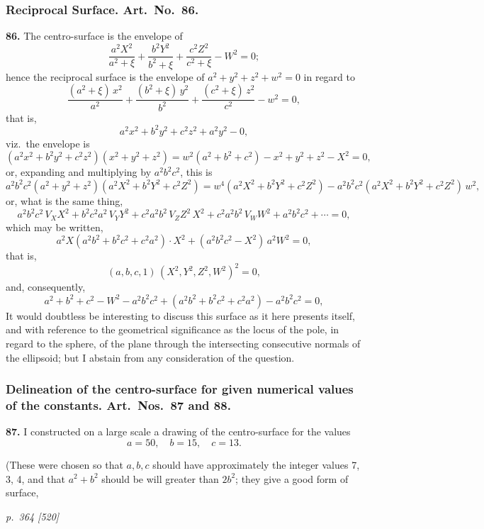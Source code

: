 \documentclass[11pt,a4paper]{article}
\theoremstyle{plain}
\theoremstyle{definition}
\begin{document}
\subsubsection*{Reciprocal Surface. Art.\ No.\ 86.}

\textbf{86.} The centro-surface is the envelope of
\[
\frac{a^2 X^2}{a^2 + \xi} + \frac{b^2 Y^2}{b^2 + \xi} + \frac{c^2 Z^2}{c^2 + \xi} - W^2 = 0;
\]
hence the reciprocal surface is the envelope of $a^2 + y^2 + z^2 + w^2 = 0$ in regard to
\[
\frac{(a^2 + \xi)\,x^2}{a^2}+\frac{(b^2 + \xi)\,y^2}{b^2}+\frac{(c^2 + \xi)\,z^2}{c^2} - w^2 = 0,
\]
that is,
\[
a^2 x^2 + b^2 y^2 + c^2 z^2 + a^2 y^2 - 0,
\]
viz.\ the envelope is
\[
(a^2 x^2 + b^2 y^2 + c^2 z^2)(x^2 + y^2 + z^2) = w^2 (a^2 + b^2 + c^2) - x^2 + y^2 + z^2 - X^2 = 0,
\]
or, expanding and multiplying by $a^2 b^2 c^2$, this is
\[
a^2 b^2 c^2 (a^2 + y^2 + z^2)(a^2 X^2 + b^2 Y^2 + c^2 Z^2) = w^4 (a^2 X^2 + b^2 Y^2 + c^2 Z^2) - a^2 b^2 c^2 (a^2 X^2 + b^2 Y^2 + c^2 Z^2)\,w^2,
\]
or, what is the same thing,
\[
a^2 b^2 c^2 \,V_X X^2 + b^2 c^2 a^2 \,V_Y Y^2 + c^2 a^2 b^2 \,V_Z Z^2 \,X^2 + c^2 a^2 b^2 \,V_W W^2 + a^2 b^2 c^2 + \cdots = 0,
\]
which may be written,
\[
a^2 X(a^2 b^2 + b^2 c^2 + c^2 a^2) \cdot X^2 + (a^2 b^2 c^2 - X^2)\,a^2 W^2 = 0,
\]
that is,
\[
(a, b, c, 1)\,(X^2, Y^2, Z^2, W^2)^2 = 0,
\]
and, consequently,
\[
a^2 + b^2 + c^2 - W^2 - a^2 b^2 c^2 + (a^2 b^2 + b^2 c^2 + c^2 a^2) - a^2 b^2 c^2 = 0,
\]
It would doubtless be interesting to discuss this surface as it here presents itself,
and with reference to the geometrical significance as the locus of the pole, in regard to the sphere, of the plane through the intersecting consecutive normals of the ellipsoid; but I abstain from any consideration of the question.

\subsubsection*{Delineation of the centro-surface for given numerical values of the constants. Art.\ Nos.\ 87 and 88.}

\textbf{87.} I constructed on a large scale a drawing of the centro-surface for the values
\[
a = 50,\quad b = 15,\quad c = 13.
\]

(These were chosen so that $a, b, c$ should have approximately the integer values 7, 3, 4, and that $a^2 + b^2$ should be will greater than $2b^2$; they give a good form of surface,

\clearpage

\bigskip
\textit{p.~364 [520]}
\smallskip
\end{document}
